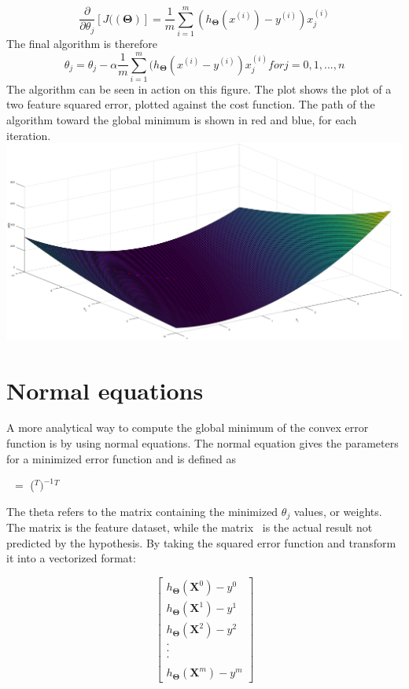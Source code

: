 \documentclass[a4paper,12pt]{article}
\begin{document}
\[\frac{\partial}{\partial\theta_j} [J((\boldsymbol{\Theta})] = \frac{1}{m} \sum_{i=1}^m (h_{\boldsymbol{\Theta}}(x^{(i)}) - y^{(i)})x_j^{(i)}\]
The final algorithm is therefore
\[\theta_j = \theta_j - \alpha \frac{1}{m} \sum_{i=1}^m (h_{\boldsymbol{\Theta}}(x^{(i)} - y^{(i)})x_j^{(i)} for j = 0,1,...,n\]
The algorithm can be seen in action on this figure. The plot shows the plot of a two feature squared error, plotted against the cost function. The path of the algorithm toward the global minimum is shown in red and blue, for each iteration. 
\\
\includegraphics[scale=0.38]{gradientdescent}

\section{Normal equations}
A more analytical way to compute the global minimum of the convex error function is by using normal equations. The normal equation gives the parameters for a minimized error function and is defined as
\begin{center}
\boldmath{$\Theta $}\unboldmath \ $=$ (\unboldmath$^T$\unboldmath$)^{-1}$\unboldmath$^T$\unboldmath
\end{center}
The theta refers to the matrix containing the minimized \(\theta_j\) values, or weights. The matrix \unboldmath is the feature dataset, while the matrix \unboldmath \ is the actual result not predicted by the hypothesis. By taking the squared error function and transform it into a vectorized format:

\[\begin{bmatrix} h_{\boldsymbol{\Theta}} (\boldsymbol{X}^0) - y^0 \\ h_{\boldsymbol{\Theta}} (\boldsymbol{X}^1) - y^1 \\ h_{\boldsymbol{\Theta}} (\boldsymbol{X}^2) - y^2 \\ . \\ . \\ . \\  \\ h_{\boldsymbol{\Theta}} (\boldsymbol{X}^m) - y^m\end{bmatrix}\]
\end{document}
